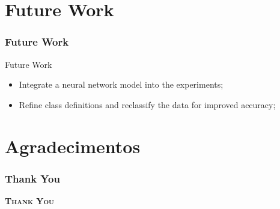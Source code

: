\section{Future Work}  %
\begin{frame}
	\frametitle{Future Work}
	\begin{block}{Future Work}
		\begin{itemize}
			\item Integrate a neural network model into the experiments;
			\item Refine class definitions and reclassify the data for improved accuracy;
		\end{itemize}
	\end{block}
\end{frame}
\section*{Agradecimentos}  %
\begin{frame}
	\frametitle{Thank You}
    \centering
	\Huge
	
	\selectfont	
	\textbf{\textsc{Thank You}}
\end{frame}

















